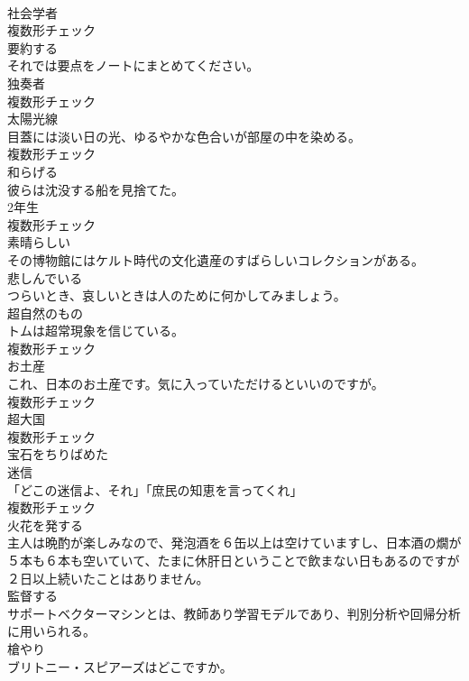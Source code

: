 \documentclass[8pt]{extreport}
\begin{document}
\begin{CJK}{UTF8}{min}
\\	[名詞]	社会学者	
\\	複数形チェック
\\	[動詞]	要約する	
\\	それでは要点をノートにまとめてください。	
\\	[名詞]	独奏者	
\\	複数形チェック
\\	[名詞]	太陽光線	
\\	目蓋には淡い日の光、ゆるやかな色合いが部屋の中を染める。	
\\	複数形チェック
\\	[動詞]	和らげる	
\\	彼らは沈没する船を見捨てた。	
\\	[名詞]	2年生	
\\	複数形チェック
\\	[形容詞]	素晴らしい	
\\	その博物館にはケルト時代の文化遺産のすばらしいコレクションがある。	
\\	[形容詞]	悲しんでいる	
\\	つらいとき、哀しいときは人のために何かしてみましょう。	
\\	[名詞]	超自然のもの	
\\	トムは超常現象を信じている。	
\\	複数形チェック
\\	[名詞]	お土産	
\\	これ、日本のお土産です。気に入っていただけるといいのですが。	
\\	複数形チェック
\\	[名詞]	超大国	
\\	複数形チェック
\\	[形容詞]	宝石をちりばめた	
\\	[名詞]	迷信	
\\	「どこの迷信よ、それ」「庶民の知恵を言ってくれ」	
\\	複数形チェック
\\	[形容詞]	火花を発する	
\\	主人は晩酌が楽しみなので、発泡酒を６缶以上は空けていますし、日本酒の燗が５本も６本も空いていて、たまに休肝日ということで飲まない日もあるのですが２日以上続いたことはありません。	
\\	[動詞]	監督する	
\\	サポートベクターマシンとは、教師あり学習モデルであり、判別分析や回帰分析に用いられる。	
\\	[名詞]	槍やり	
\\	ブリトニー・スピアーズはどこですか。	

\end{CJK}
\end{document}
